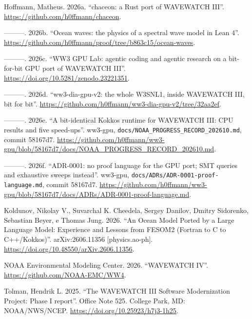 \documentclass[10pt,a4paper,]{article}
\newlength{\cslhangindent}
\newenvironment{CSLReferences}[2] %
 {\small\begin{list}{}{%
  \setlength{\itemindent}{0pt}
  \setlength{\leftmargin}{0pt}
  \setlength{\parsep}{0pt}
  \ifodd #1
   \setlength{\leftmargin}{\cslhangindent}
   \setlength{\itemindent}{-1\cslhangindent}
  \fi
  \setlength{\itemsep}{#2\baselineskip}}}
 {\end{list}}
\begin{document}
\protect{}\label{refs}
\begin{CSLReferences}{1}{0}
Hoffmann, Matheus. 2026a. {``{chaceon}: a {Rust} port of {WAVEWATCH
III}''}. \url{https://github.com/h0ffmann/chaceon}.

---------. 2026b. {``Ocean waves: the physics of a spectral wave model
in {Lean} 4''}.
\url{https://github.com/h0ffmann/proof/tree/b863c15/ocean-waves}.

---------. 2026c. {``{WW3 GPU Lab}: agentic coding and agentic research
on a bit-for-bit {GPU} port of {WAVEWATCH III}''}.
\url{https://doi.org/10.5281/zenodo.23221351}.

---------. 2026d. {``{ww3-dia-gpu-v2}: the whole {W3SNL1}, inside
{WAVEWATCH III}, bit for bit''}.
\url{https://github.com/h0ffmann/ww3-dia-gpu-v2/tree/32aa2ef}.

---------. 2026e. {``A bit-identical {Kokkos} runtime for {WAVEWATCH
III}: {CPU} results and five speed-ups''}. ww3-gpu,
\texttt{docs/NOAA\_PROGRESS\_RECORD\_202610.md}, commit 58167d7.
\url{https://github.com/h0ffmann/ww3-gpu/blob/58167d7/docs/NOAA_PROGRESS_RECORD_202610.md}.

---------. 2026f. {``{ADR-0001}: no proof language for the {GPU} port;
{SMT} queries and exhaustive sweeps instead''}. ww3-gpu,
\texttt{docs/ADRs/ADR-0001-proof-language.md}, commit 58167d7.
\url{https://github.com/h0ffmann/ww3-gpu/blob/58167d7/docs/ADRs/ADR-0001-proof-language.md}.

Koldunov, Nikolay V., Suvarchal K. Cheedela, Sergey Danilov, Dmitry
Sidorenko, Sebastian Beyer, e Thomas Jung. 2026. {``An Ocean Model
Ported by a Large Language Model: Experience and Lessons from {FESOM2}
({Fortran} to {C} to {C++/Kokkos})''}. arXiv:2606.11356
{[}physics.ao-ph{]}. \url{https://doi.org/10.48550/arXiv.2606.11356}.

NOAA Environmental Modeling Center. 2026. {``{WAVEWATCH IV}''}.
\url{https://github.com/NOAA-EMC/WW4}.

Tolman, Hendrik L. 2025. {``The {WAVEWATCH III} Software Modernization
Project: Phase {I} report''}. Office Note 525. College Park, MD:
NOAA/NWS/NCEP. \url{https://doi.org/10.25923/h7j3-1h25}.

\end{CSLReferences}
\end{document}
